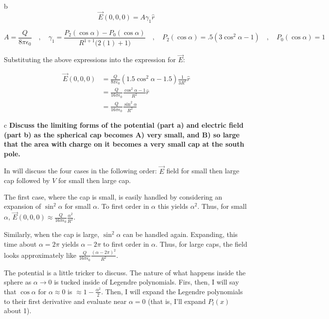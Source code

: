 \begin{homeworkProblem}
\begin{homeworkSection}{b}
\[
\vec{E}(0,0,0)= A \gamma_1 \hat{r} \nonumber
\]
\begin{center}
\[
	A = \frac{Q}{8\pi \epsilon_0} \quad,\quad \gamma_1 = \frac{P_2(\cos\alpha)-P_0(\cos\alpha)}{R^{1+1}\big(2(1)+1\big)} \quad,\quad P_2(\cos\alpha) = .5(3\cos^2\alpha-1) \quad,\quad P_0(\cos\alpha) = 1
\]
\end{center}

Substituting the above expressions into the expression for $\vec{E}$: 
\begin{center}
	\begin{align}
		\vec{E}(0,0,0) &= \frac{Q}{8\pi \epsilon_0} (1.5 \cos^2\alpha - 1.5)\frac{1}{3R^2} \hat{r} \nonumber \\
		&= \frac{Q}{16\pi \epsilon_0} \frac{\cos^2\alpha - 1}{R^2} \hat{r} \nonumber \\
		&= \frac{Q}{16\pi \epsilon_0} \frac{\sin^2\alpha}{R^2} \nonumber
	\end{align}
\end{center}

\problemAnswer{\[\vec{E}(0,0,0) = \frac{Q}{16\pi \epsilon_0} \frac{\sin^2\alpha}{R^2} \nonumber\]}

\end{homeworkSection}

\begin{homeworkSection}{c}
\textbf{Discuss the limiting forms of the potential (part a) and electric field (part b) 
as the spherical cap becomes A) very small, and B) so large that the area with 
charge on it becomes a very small cap at the south pole.}

In will discuss the four cases in the following order: $\vec{E}$ field for small then large cap followed by $V$ for small then large cap.

The first case, where the cap is small, is easily handled by considering an expansion of $\sin^2\alpha$ for small $\alpha$. To first order in $\alpha$ this yields $\alpha^2$. Thus, for small $\alpha$, $\vec{E}(0,0,0) \approx \frac{Q}{16\pi\epsilon_0} \frac{\alpha^2}{R^2}$.

Similarly, when the cap is large, $\sin^2\alpha$ can be handled again. Expanding, this time about $\alpha = 2\pi$ yields $\alpha - 2\pi$ to first order in $\alpha$. Thus, for large caps, the field looks approximately like $\frac{Q}{16\pi\epsilon_0}\frac{(\alpha-2\pi)^2}{R^2}$.

The potential is a little tricker to discuss. The nature of what happens inside the sphere as $\alpha \rightarrow 0$ is tucked inside of Legendre polynomials. Firs, then, I will say that $\cos\alpha$ for $\alpha \approx 0$ is $\approx 1-\frac{\alpha^2}{2}$. Then, I will expand the Legendre polynomials to their first derivative and evaluate near $\alpha = 0$ (that is, I'll expand $P_l(x)$ about 1).


\end{homeworkSection}
\end{homeworkProblem}
